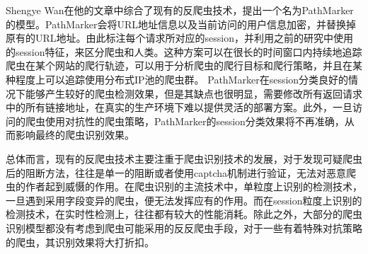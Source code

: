 \documentclass[doctor,privacy,twoside]{buaa_mac}
\begin{document}
  Shengye Wan在他的文章中综合了现有的反爬虫技术，提出一个名为PathMarker的模型。PathMarker会将URL地址信息以及当前访问的用户信息加密，并替换掉原有的URL地址。由此标注每个请求所对应的session，并利用之前的研究中使用的session特征，来区分爬虫和人类。这种方案可以在很长的时间窗口内持续地追踪爬虫在某个网站的爬行轨迹，可以用于分析爬虫的爬行目标和爬行策略，并且在某种程度上可以追踪使用分布式IP池的爬虫群。 PathMarker在session分类良好的情况下能够产生较好的爬虫检测效果，但是其缺点也很明显，需要修改所有返回请求中的所有链接地址，在真实的生产环境下难以提供灵活的部署方案。此外，一旦访问的爬虫使用对抗性的爬虫策略，PathMarker的session分类效果将不再准确，从而影响最终的爬虫识别效果。

  总体而言，现有的反爬虫技术主要注重于爬虫识别技术的发展，对于发现可疑爬虫后的阻断方法，往往是单一的阻断或者使用captcha机制进行验证，无法对恶意爬虫的作者起到威慑的作用。在爬虫识别的主流技术中，单粒度上识别的检测技术，一旦遇到采用字段变异的爬虫，便无法发挥应有的作用。而在session粒度上识别的检测技术，在实时性检测上，往往都有较大的性能消耗。除此之外，大部分的爬虫识别模型都没有考虑到爬虫可能采用的反反爬虫手段，对于一些有着特殊对抗策略的爬虫，其识别效果将大打折扣。







\end{document}

